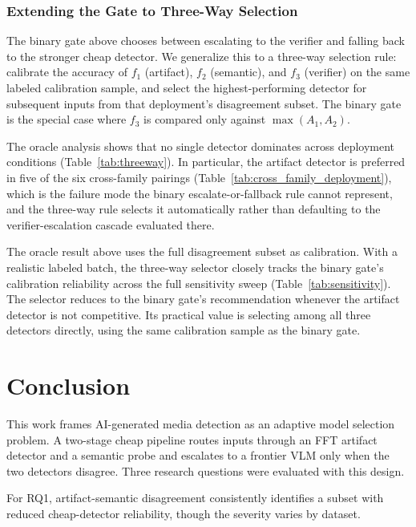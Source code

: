 \documentclass{ieeeaccess}
\begin{document}
\subsubsection{Extending the Gate to Three-Way Selection}
\label{sec:threeway}

The binary gate above chooses between escalating to the verifier and
falling back to the stronger cheap detector. We generalize this to a
three-way selection rule: calibrate the accuracy of $f_1$ (artifact),
$f_2$ (semantic), and $f_3$ (verifier) on the same labeled calibration
sample, and select the highest-performing detector for subsequent inputs
from that deployment's disagreement subset. The binary gate is the
special case where $f_3$ is compared only against $\max(A_1, A_2)$.

The oracle analysis shows that no single detector dominates across
deployment conditions (Table~\ref{tab:threeway}). In particular, the
artifact detector is preferred in five of the six cross-family pairings
(Table~\ref{tab:cross_family_deployment}), which is the failure mode the
binary escalate-or-fallback rule cannot represent, and the three-way rule
selects it automatically rather than defaulting to the verifier-escalation
cascade evaluated there.


The oracle result above uses the full disagreement subset as calibration.
With a realistic labeled batch, the three-way selector closely tracks the
binary gate's calibration reliability across the full sensitivity sweep
(Table~\ref{tab:sensitivity}). The selector reduces to the binary gate's
recommendation whenever the artifact detector is not competitive. Its practical
value is selecting among all three detectors directly, using the same calibration
sample as the binary gate.



\section{Conclusion}

This work frames AI-generated media detection as an adaptive model selection problem. A two-stage cheap pipeline routes inputs through an FFT artifact detector and a semantic probe and escalates to a frontier VLM only when the two detectors disagree. Three research questions were evaluated with this design.

For RQ1, artifact-semantic disagreement consistently identifies a subset with reduced
cheap-detector reliability, though the severity varies by dataset.
\end{document}
